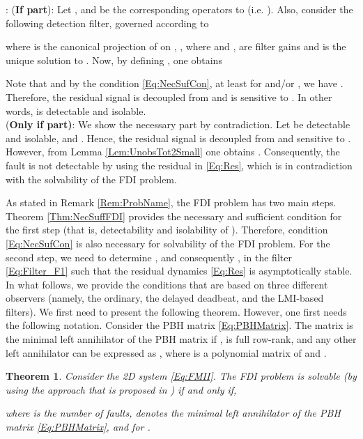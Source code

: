 \documentclass[journal,12pt,draftcls,onecolumn]{IEEEtran}
\def\QEDclosed{\hfill\IEEEQEDclosed}
\renewcommand{\qed}{\QEDclosed}
\renewenvironment{proof}[1][\proofname]{\noindent\nobreakspace{\bfseries #1}:\;}{\qed\par}
\newtheorem{theorem}{Theorem}
\begin{document}
\begin{proof}
	({\bf If part}): Let ,  and  be the corresponding operators to  (i.e. ). Also, consider the following detection filter, governed according to 
		
		where  is the canonical projection of  on , ,  where  and ,  are filter gains  and  is the unique solution to .
		Now, by defining , one obtains
		
		Note that  and by the condition \eqref{Eq:NecSufCon}, at least for  and/or , we have . Therefore, the residual signal  is decoupled from  and is sensitive to . In other words,  is detectable and isolable.\\
		{(\bf Only if part)}: We show the necessary part by contradiction. Let  be detectable and isolable, and . Hence, the residual signal  is decoupled from  and sensitive to . However, from Lemma \ref{Lem:UnobsTot2Small} one obtains . Consequently, the fault  is not detectable by using the residual  in \eqref{Eq:Res}, which is in contradiction with the solvability of the FDI problem. 
\end{proof}


	As stated in Remark \ref{Rem:ProbName}, the FDI problem has two main steps. Theorem \ref{Thm:NecSuffFDI} provides the necessary and sufficient condition for the first step (that is, detectability and isolability of ). Therefore,  condition \eqref{Eq:NecSufCon} is also necessary for solvability of the FDI problem. For the second step, we need to determine , and consequently ,  in the filter \eqref{Eq:Filter_F1} such that the residual dynamics \eqref{Eq:Res} is asymptotically stable. 
	In what follows, we provide the conditions that are based on three different observers (namely, the ordinary, the delayed deadbeat, and the LMI-based filters). We first need to present the following theorem. However, one first needs the following notation. Consider the PBH matrix \eqref{Eq:PBHMatrix}. The matrix   is the minimal left annihilator of the PBH matrix if ,  is full row-rank, and any other left annihilator  can be expressed as , where  is a polynomial matrix of  and .
\begin{theorem}\cite{BisiaccoLetter}\label{Thm:BisiacoLetter}
	Consider the 2D system \eqref{Eq:FMII}. The FDI problem is solvable (by using the approach that is proposed in \cite{BisiaccoLetter}) if and only if,
	
	where  is the number of faults,  denotes the minimal left annihilator of the PBH matrix  \eqref{Eq:PBHMatrix}, and  for .
\end{theorem}
\end{document}
